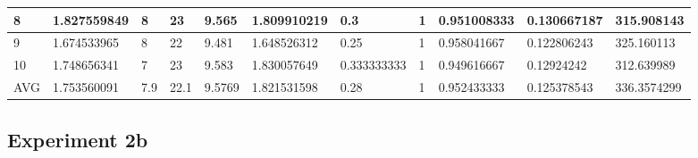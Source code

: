 \begin{table}[H]
\begin{adjustbox}{max width=380pt,keepaspectratio,angle=90}
\begin{tabular}{|l|l|l|l|l|l|l|l|l|l|l|}
						8          & 1.827559849 & 8          & 23         & 9.565      & 1.809910219 & 0.3         & 1           & 0.951008333 & 0.130667187 & 315.908143  \\ \hline
						9          & 1.674533965 & 8          & 22         & 9.481      & 1.648526312 & 0.25        & 1           & 0.958041667 & 0.122806243 & 325.160113  \\ \hline
						10         & 1.748656341 & 7          & 23         & 9.583      & 1.830057649 & 0.333333333 & 1           & 0.949616667 & 0.12924242  & 312.639989  \\ \hline\hline
						AVG        & 1.753560091 & 7.9        & 22.1       & 9.5769     & 1.821531598 & 0.28        & 1           & 0.952433333 & 0.125378543 & 336.3574299 \\ \hline						
					\end{tabular}
				\end{adjustbox}	
			\end{table}
	
	\subsection{Experiment 2b}
	\label{sec:A_Exp2b}
